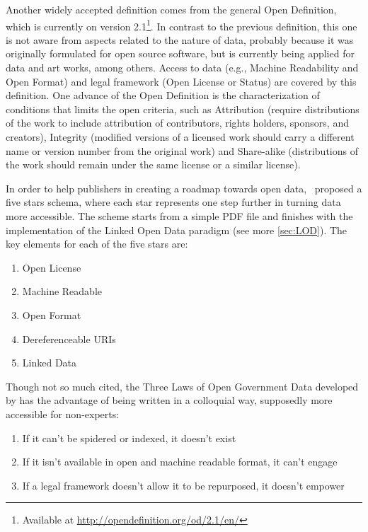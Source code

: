 Another widely accepted definition comes from the general Open Definition, which is currently on version 2.1\footnote{Available at \url{http://opendefinition.org/od/2.1/en/}}.
In contrast to the previous definition, this one is not aware from aspects related to the nature of data, probably because it was originally formulated for open source software, but is currently being applied for data and art works, among others. 
Access to data (e.g., Machine Readability and Open Format) and legal framework (Open License or Status) are covered by this definition.
One advance of the Open Definition is the characterization of conditions that limits the open criteria, such as Attribution (require distributions of the work to include attribution of contributors, rights holders, sponsors, and creators), Integrity (modified versions of a licensed work should carry a different name or version number from the original work) and Share-alike (distributions of the work should remain under the same license or a similar license).

In order to help publishers in creating a roadmap towards open data,~ proposed a five stars schema, where each star represents one step further in turning data more accessible.
The scheme starts from a simple PDF file and finishes with the implementation of the Linked Open Data paradigm (see more \autoref{sec:LOD}).
The key elements for each of the five stars are:

\begin{enumerate}
	\item Open License
	\item Machine Readable
	\item Open Format
	\item Dereferenceable URIs
	\item Linked Data
\end{enumerate}

Though not so much cited, the Three Laws of Open Government Data developed by  has the advantage of being written in a colloquial way, supposedly more accessible for non-experts:

\begin{enumerate}
	\item If it can't be spidered or indexed, it doesn’t exist
	\item If it isn’t available in open and machine readable format, it can’t engage
	\item If a legal framework doesn’t allow it to be repurposed, it doesn’t empower
\end{enumerate}

